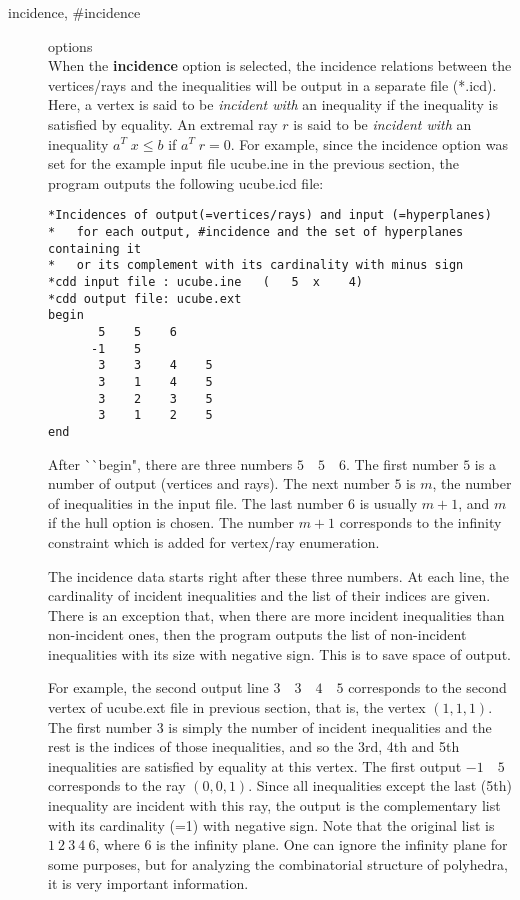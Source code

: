 \begin{description}
\item[incidence, \#incidence] options\\
When the {\bf incidence} option is selected, the incidence relations between
the vertices/rays and the inequalities will be output
in a separate file (*.icd).  Here, a vertex is said to be 
{\em incident with\/} an inequality if the inequality is satisfied by equality.
An extremal ray $r$ is said to be {\em incident with\/} 
an inequality $a^T \; x \le b$ if  $a^T \; r = 0$.  For example,
since the incidence option was set for the example input file ucube.ine in
the previous section, the program outputs the following ucube.icd file:
\begin{verbatim}
*Incidences of output(=vertices/rays) and input (=hyperplanes)
*   for each output, #incidence and the set of hyperplanes containing it
*   or its complement with its cardinality with minus sign
*cdd input file : ucube.ine   (   5  x    4)
*cdd output file: ucube.ext
begin
       5    5    6
      -1    5
       3    3    4    5
       3    1    4    5
       3    2    3    5
       3    1    2    5
end
\end{verbatim}
After ^^ ^^ begin", there are three numbers $5 \quad 5 \quad 6$.
The first number $5$ is a number of output (vertices and rays).
The next number $5$ is $m$, the number of inequalities in the input file.
The last number $6$ is usually $m+1$, and $m$ if the hull option is chosen.
The number $m+1$ corresponds to the infinity constraint which is added
for vertex/ray enumeration.

The incidence data starts right after these three numbers.
At each line, the cardinality of incident inequalities and
the list of their indices are given.  There is an exception that, when
there are more incident inequalities than non-incident ones, then the program
outputs the list of non-incident inequalities with its
size with negative sign.  This is to save space of output.

For example, the second output line $3 \quad 3 \quad 4 \quad 5$ 
corresponds to the
second vertex of ucube.ext file in previous section, that is, 
the vertex $(1, 1, 1)$.  The first number $3$ is simply the number
of incident inequalities and the rest is the indices of
those inequalities, and so the 3rd, 4th and 5th inequalities are
satisfied by equality at this vertex.   The first output
$-1 \quad 5$ corresponds to the ray  $(0,0,1)$.  Since all inequalities
except the last (5th) inequality are incident with this ray,
the output is the complementary list with its cardinality (=1) with negative
sign.  Note that the original list is $1 \: 2 \: 3 \: 4 \: 6$, where
$6$ is the infinity plane.  One can ignore the infinity
plane for some purposes,  but for analyzing the combinatorial 
structure of polyhedra, it is
very important information.


\end{description}
